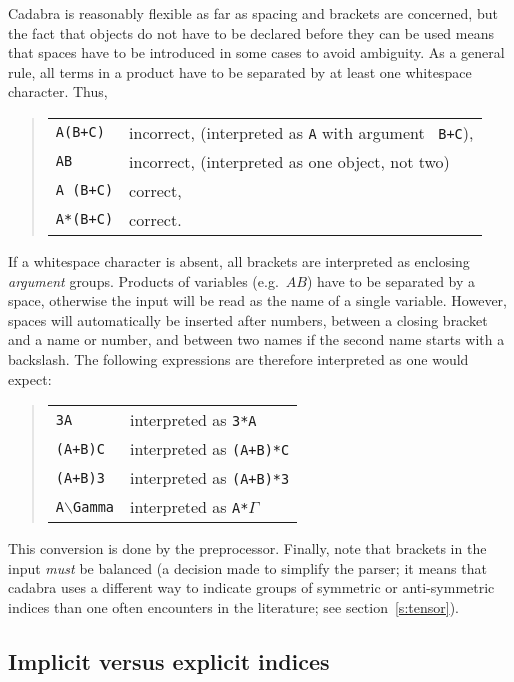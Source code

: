 \documentclass[11pt]{article}
\newcommand{\cdb}{{cadabra}\xspace}
\newcommand{\Cdb}{{Cadabra}\xspace}
\numberwithin{equation}{section}
\begin{document}
\Cdb is reasonably flexible as far as spacing and brackets are
concerned, but the fact that objects do not have to be declared before
they can be used means that spaces have to be introduced in some cases
to avoid ambiguity. As a general rule, all terms in a product have to
be separated by at least one whitespace character. Thus,
\begin{quote}
\begin{tabular}{ll}
{\tt A(B+C)}   & incorrect, (interpreted as {\tt A} with argument {\tt
  B+C}), \\[1ex]
{\tt AB}       & incorrect, (interpreted as one object, not two) \\[1ex]
{\tt A (B+C)}  & correct, \\[1ex]
{\tt A*(B+C)}  & correct.
\end{tabular}
\end{quote}
If a whitespace character is absent, all brackets are interpreted as
enclosing \emph{argument} groups. Products of variables (e.g.~$AB$)
have to be separated by a space, otherwise the input will be read as
the name of a single variable.  However, spaces will automatically be
inserted after numbers, between a closing bracket and a name or
number, and between two names if the second name starts with a
backslash. The following expressions are therefore interpreted as one
would expect:
\begin{quote}
\begin{tabular}{ll}
{\tt 3A}     & interpreted as {\tt 3*A}\\[1ex]
{\tt (A+B)C} & interpreted as {\tt (A+B)*C}\\[1ex]
{\tt (A+B)3} & interpreted as {\tt (A+B)*3}\\[1ex]
{\tt A$\backslash$Gamma}& interpreted as {\tt A*$\Gamma$}\\[1ex]
\end{tabular}
\end{quote}
This conversion is done by the preprocessor. Finally, note that
brackets in the input \emph{must} be balanced (a decision made to
simplify the parser; it means that \cdb uses a different way to
indicate groups of symmetric or anti-symmetric indices than one often
encounters in the literature; see section~\ref{s:tensor}).

\subsection{Implicit versus explicit indices}
\end{document}
